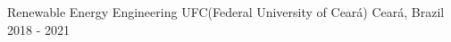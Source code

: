 

\begin{cventries}

  \cventry
    {Renewable Energy Engineering} %
    {UFC(Federal University of Ceará)} %
    {Ceará, Brazil} %
    {2018 - 2021} %
    {
      \begin{cvitems} %
      \end{cvitems}
    }

\end{cventries}
